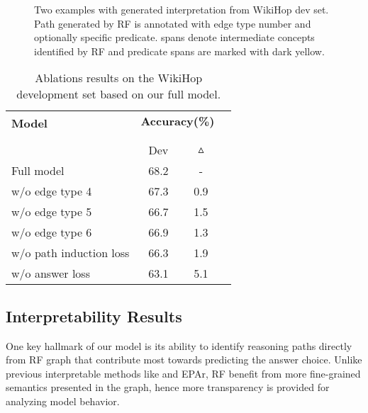 \begin{figure*}[t!]
	\centering
	\caption{Two examples with generated interpretation from WikiHop dev set. Path generated by RF is annotated with edge type number and optionally specific predicate. {\color{gray}{Gray-colored}} spans denote intermediate concepts identified by RF and predicate spans are marked with dark yellow.} \label{fig:overview}
	\label{fig:path}
\end{figure*}
\begin{table}[t]
\small
\centering
\begin{tabular}{@{}l|ccc@{}}
\toprule
  \multirow{2}{*}{\textbf{Model}} &\multicolumn{2}{c}{\textbf{Accuracy(\%)}} \\ 
  \\ [-1.8ex]
  \cline{2-3}
  \\ [-1.8ex]
  &Dev & $\bm{\vartriangle}$ \\
 \midrule
Full model &68.2          &-                   \\
\midrule
\midrule
w/o edge type 4 &67.3          &0.9                   \\
w/o edge type 5 &66.7          &1.5                   \\
w/o edge type 6 &66.9          &1.3                   \\
w/o path induction loss &66.3          &1.9                   \\
w/o answer loss &63.1          &5.1                   \\
\bottomrule
\end{tabular}
\caption{Ablations results on the WikiHop development set based on our full model.}
\label{tab:ablation}
\end{table}



\subsection{Interpretability Results}
\label{sec:inter}
One key hallmark of our model is its ability to identify reasoning paths directly from RF graph that contribute most towards predicting the answer choice. Unlike previous interpretable methods like \cite{Kundu2019} and EPAr, RF benefit from more fine-grained semantics presented in the graph, hence more transparency is provided for analyzing model behavior. 

